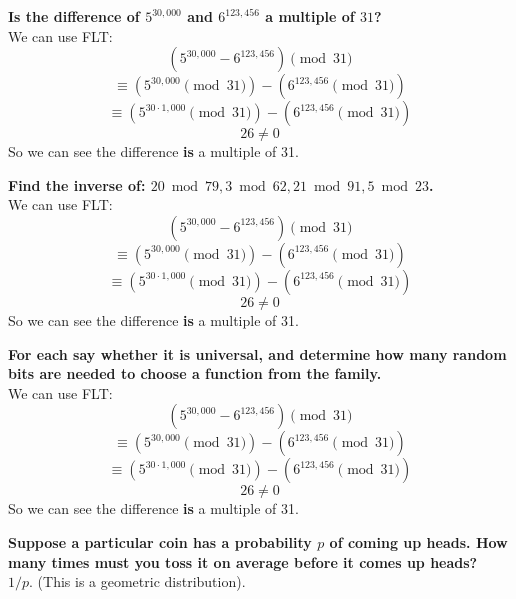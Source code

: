 \begin{problem}{1.14}
    \textbf{Is the difference of $5^{30,000}$ and $6^{123,456}$ a multiple of $31$?}
    \\
    We can use FLT:
    \[
        (5^{30,000} - 6^{123,456}) \pmod{31}
    \]
    \[
        \equiv (5^{30,000} \pmod{31}) - (6^{123,456} \pmod{31})
    \]
    \[
        \equiv (5^{30\cdot 1,000} \pmod{31}) - (6^{123,456} \pmod{31})
    \]
    \[
        26 \neq 0
    \]
    So we can see the difference \textbf{is} a multiple of 31.
\end{problem}

\begin{problem}{1.20}
    \textbf{Find the inverse of: $20 \bmod 79, 3 \bmod 62, 21 \bmod 91, 5 \bmod 23$.}
    \\
    We can use FLT:
    \[
        (5^{30,000} - 6^{123,456}) \pmod{31}
    \]
    \[
        \equiv (5^{30,000} \pmod{31}) - (6^{123,456} \pmod{31})
    \]
    \[
        \equiv (5^{30\cdot 1,000} \pmod{31}) - (6^{123,456} \pmod{31})
    \]
    \[
        26 \neq 0
    \]
    So we can see the difference \textbf{is} a multiple of 31.
\end{problem}

\begin{problem}{1.29}
    \textbf{For each say whether it is universal, and determine how many random bits are needed to choose a function from the family.}
    \\
    We can use FLT:
    \[
        (5^{30,000} - 6^{123,456}) \pmod{31}
    \]
    \[
        \equiv (5^{30,000} \pmod{31}) - (6^{123,456} \pmod{31})
    \]
    \[
        \equiv (5^{30\cdot 1,000} \pmod{31}) - (6^{123,456} \pmod{31})
    \]
    \[
        26 \neq 0
    \]
    So we can see the difference \textbf{is} a multiple of 31.
\end{problem}

\begin{problem}{1.34}
    \textbf{Suppose a particular coin has a probability $p$ of coming up heads. How many times must you toss it on average before it comes up heads?}
    \\
    $1/p$. (This is a geometric distribution).
\end{problem}
